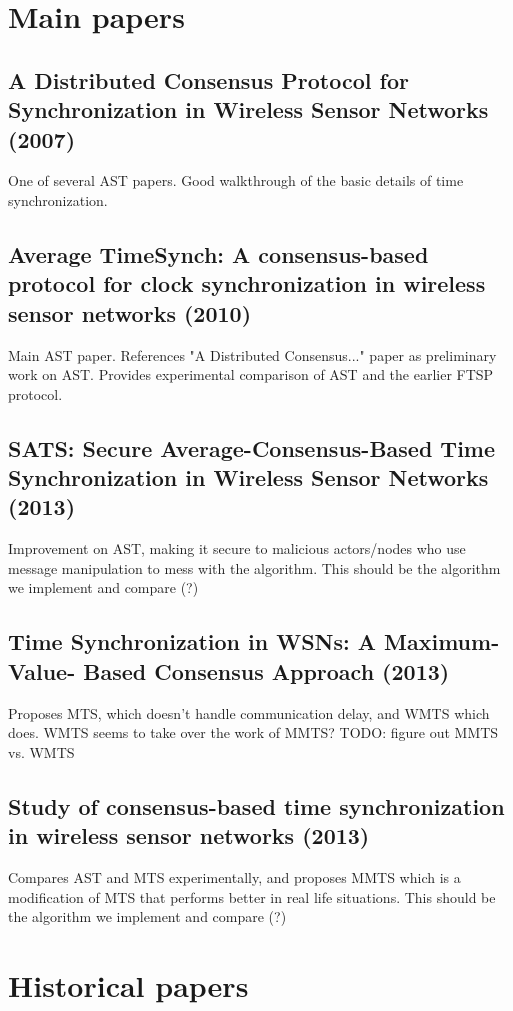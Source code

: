 \documentclass{article}
\begin{document}
\section{Main papers}

\subsection*{A Distributed Consensus Protocol for Synchronization in Wireless Sensor Networks (2007)}
One of several AST papers. Good walkthrough of the basic details of time synchronization.

\subsection*{Average TimeSynch: A consensus-based protocol for clock synchronization in wireless sensor networks (2010)}
Main AST paper. References "A Distributed Consensus..." paper as preliminary work on AST. Provides experimental comparison of AST and the earlier FTSP protocol.

\subsection*{SATS: Secure Average-Consensus-Based Time Synchronization in Wireless Sensor Networks (2013)}
Improvement on AST, making it secure to malicious actors/nodes who use message manipulation to mess with the algorithm. This should be the algorithm we implement and compare (?)

\subsection*{Time Synchronization in WSNs: A Maximum-Value-
Based Consensus Approach (2013)}
Proposes MTS, which doesn't handle communication delay, and WMTS which does. WMTS seems to take over the work of MMTS? TODO: figure out MMTS vs. WMTS

\subsection*{Study of consensus-based time synchronization in wireless
sensor networks (2013)}
Compares AST and MTS experimentally, and proposes MMTS which is a modification of MTS that performs better in real life situations. This should be the algorithm we implement and compare (?)

\vspace{4em}
\section{Historical papers}
\end{document}
